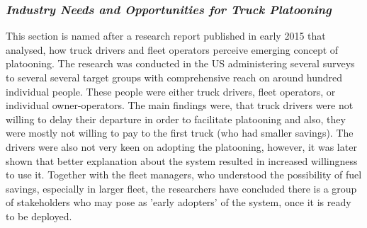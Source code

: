 \subsubsection{\textit{Industry Needs and Opportunities for Truck Platooning}}
% 
This section is named after a research report \cite{Shladover2015IndustryPlatooning} published in early 2015 that analysed, how truck drivers and fleet operators perceive emerging concept of platooning. The research was conducted in the US administering several surveys to several several target groups with comprehensive reach on around hundred individual people. These people were either truck drivers, fleet operators, or individual owner-operators\footnotemark. The main findings were, that truck drivers were not willing to delay their departure in order to facilitate platooning and also, they were mostly not willing to pay to the first truck (who had smaller savings). The drivers were also not very keen on adopting the platooning, however, it was later shown that better explanation about the system resulted in increased willingness to use it. Together with the fleet managers, who understood the possibility of fuel savings, especially in larger fleet, the researchers have concluded there is a group of stakeholders who may pose as 'early adopters' of the system, once it is ready to be deployed.\par
% 
